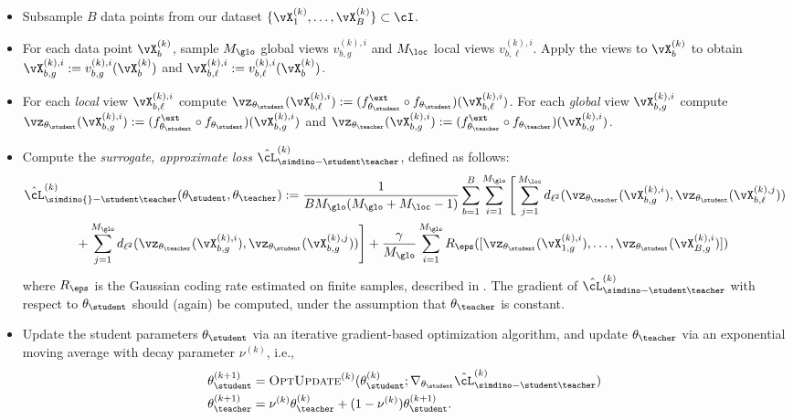 \documentclass[../../book-main.tex]{subfiles}
\begin{document}
\begin{itemize}
    \item Subsample \(B\) data points from our dataset \(\{\vX_{1}^{(k)}, \dots, \vX_{B}^{(k)}\} \subset \cI\).
    \item For each data point \(\vX_{b}^{(k)}\), sample \(M_{\glo}\) global views \(v_{b, g}^{(k), i}\) and \(M_{\loc}\) local views \(v_{b, \ell}^{(k), i}\). Apply the views to \(\vX_{b}^{(k)}\) to obtain \(\vX_{b, g}^{(k), i} := v_{b, g}^{(k), i}(\vX_{b}^{(k)})\) and \(\vX_{b, \ell}^{(k), i} := v_{b, \ell}^{(k), i}(\vX_{b}^{(k)})\).
    \item For each \textit{local} view \(\vX_{b, \ell}^{(k), i}\) compute \(\vz_{\theta_{\student}}(\vX_{b, \ell}^{(k), i}) := (f_{\theta_{\student}}^{\ext} \circ f_{\theta_{\student}})(\vX_{b, \ell}^{(k), i})\). For each \textit{global} view \(\vX_{b, g}^{(k), i}\) compute \(\vz_{\theta_{\student}}(\vX_{b, g}^{(k), i}) := (f_{\theta_{\student}}^{\ext} \circ f_{\theta_{\student}})(\vX_{b, g}^{(k), i})\) and \(\vz_{\theta_{\teacher}}(\vX_{b, g}^{(k), i}) := (f_{\theta_{\teacher}}^{\ext} \circ f_{\theta_{\teacher}})(\vX_{b, g}^{(k), i})\).
    \item Compute the \textit{surrogate, approximate loss} \(\hat{\cL}_{\simdino-\student\teacher}^{(k)}\), defined as follows: 
    \begin{align}\label{eq:simdino_loss_teacherstudent_empirical}
        &\hat{\cL}_{\simdino{}-\student\teacher}^{(k)}(\theta_{\student}, \theta_{\teacher}) :=
        \frac{1}{BM_{\glo}(M_{\glo} + M_{\loc} - 1)}\sum_{b = 1}^{B}\sum_{i = 1}^{M_{\glo}}\Bigg[\sum_{j = 1}^{M_{\loc}}d_{\ell^{2}}(\vz_{\theta_{\teacher}}(\vX_{b, g}^{(k), i}), \vz_{\theta_{\student}}(\vX_{b, \ell}^{(k), j})) \\ 
        &\qquad \qquad + \sum_{j = 1}^{M_{\glo}}d_{\ell^{2}}(\vz_{\theta_{\teacher}}(\vX_{b, g}^{(k), i}), \vz_{\theta_{\student}}(\vX_{b, g}^{(k), j}))\Bigg] + \frac{\gamma}{M_{\glo}}\sum_{i = 1}^{M_{\glo}}R_{\eps}([\vz_{\theta_{\student}}(\vX_{1, g}^{(k), i}), \dots, \vz_{\theta_{\student}}(\vX_{B, g}^{(k), i})])\nonumber
    \end{align}
    where \(R_{\eps}\) is the Gaussian coding rate estimated on finite samples, described in . The gradient of \(\hat{\cL}_{\simdino-\student\teacher}^{(k)}\) with respect to \(\theta_{\student}\) should (again) be computed, under the assumption that \(\theta_{\teacher}\) is constant.
    \item Update the student parameters \(\theta_{\student}\) via an iterative gradient-based optimization algorithm, and update \(\theta_{\teacher}\) via an exponential moving average with decay parameter \(\nu^{(k)}\), i.e., 
    \begin{align}
        \theta_{\student}^{(k + 1)}
        &= \textsc{OptUpdate}^{(k)}(\theta_{\student}^{(k)}; \nabla_{\theta_{\student}}\hat{\cL}_{\simdino-\student\teacher}^{(k)}) \\
        \theta_{\teacher}^{(k + 1)}
        &= \nu^{(k)}\theta_{\teacher}^{(k)} + (1 - \nu^{(k)})\theta_{\student}^{(k + 1)}.
    \end{align}
\end{itemize}
\end{document}
